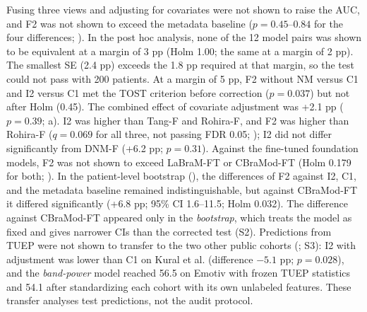 Fusing three views and adjusting for covariates were not shown to raise the AUC, and F2 was not shown to exceed the metadata baseline ($p = 0.45$--$0.84$ for the four differences; ). In the post hoc analysis, none of the 12 model pairs was shown to be equivalent at a margin of 3 pp (Holm 1.00; the same at a margin of 2 pp). The smallest SE (2.4 pp) exceeds the 1.8 pp required at that margin, so the test could not pass with 200 patients. At a margin of 5 pp, F2 without NM versus C1 and I2 versus C1 met the TOST criterion before correction ($p = 0.037$) but not after Holm (0.45). The combined effect of covariate adjustment was +2.1 pp ($p = 0.39$; a).
I2 was higher than Tang-F and Rohira-F, and F2 was higher than Rohira-F ($q = 0.069$ for all three, not passing FDR 0.05; ); I2 did not differ significantly from DNM-F (+6.2 pp; $p = 0.31$).
Against the fine-tuned foundation models, F2 was not shown to exceed LaBraM-FT or CBraMod-FT (Holm 0.179 for both; ). In the patient-level bootstrap (), the differences of F2 against I2, C1, and the metadata baseline remained indistinguishable, but against CBraMod-FT it differed significantly (+6.8 pp; 95\% CI 1.6--11.5; Holm 0.032).
The difference against CBraMod-FT appeared only in the \textit{bootstrap}, which treats the model as fixed and gives narrower CIs than the corrected test (S2).
Predictions from TUEP were not shown to transfer to the two other public cohorts (; S3): I2 with adjustment was lower than C1 on Kural et al. (difference $-5.1$ pp; $p = 0.028$), and the \textit{band-power} model reached 56.5 on Emotiv with frozen TUEP statistics and 54.1 after standardizing each cohort with its own unlabeled features. These transfer analyses test predictions, not the audit protocol.


